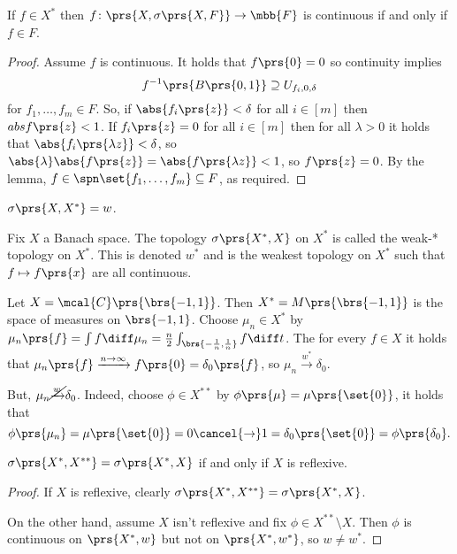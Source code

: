 \documentclass[10pt, twoside]{book}
\begin{document}
\begin{proposition}
If $f \in X^*$ then $f \colon \prs{X, \sigma\prs{X,F}} \to \mbb{F}$ is continuous if and only if $f \in F$.
\end{proposition}

\begin{proof}
Assume $f$ is continuous. It holds that $f\prs{0} = 0$ so continuity implies
\[f^{-1}\prs{B\prs{0,1}} \supseteq U_{f_i, 0, \delta}\]
for $f_1, \ldots, f_m \in F$. So, if $\abs{f_i\prs{z}} < \delta$ for all $i \in [m]$ then $abs{f\prs{z}} < 1$.
If $f_i\prs{z} = 0$ for all $i \in [m]$ then for all $\lambda > 0$ it holds that $\abs{f_i\prs{\lambda z}} < \delta$, so $\abs{\lambda} \abs{f\prs{z}} = \abs{f\prs{\lambda z}} < 1$, so $f\prs{z} = 0$. By the lemma, $f \in \spn\set{f_1, \ldots, f_m} \subseteq F$, as required.
\end{proof}

\begin{example}
$\sigma\prs{X, X^*} = w$.
\end{example}

\begin{example}
Fix $X$ a Banach space. The topology $\sigma\prs{X^*, X}$ on $X^*$ is called the weak-* topology on $X^*$. This is denoted $w^*$ and is the weakest topology on $X^*$ such that $f \mapsto f\prs{x}$ are all continuous.
\end{example}

\begin{example}
Let $X = \mcal{C}\prs{\brs{-1,1}}$. Then $X^* = M\prs{\brs{-1,1}}$ is the space of measures on $\brs{-1,1}$.
Choose $\mu_n \in X^*$ by $\mu_n\prs{f} = \int f \diff \mu_n = \frac{n}{2} \int_{\brs{-\frac{1}{n}, \frac{1}{n}}} f \diff t$.
The for every $f \in X$ it holds that $\mu_n\prs{f} \xrightarrow{n\to\infty} f\prs{0} = \delta_0\prs{f}$, so $\mu_n \xrightarrow{w^*} \delta_0$.

But, $\mu_n \cancel{\xrightarrow{w}} \delta_0$. Indeed, choose $\phi \in X^{**}$ by $\phi\prs{\mu} = \mu\prs{\set{0}}$,
it holds that
\[\phi\prs{\mu_n} = \mu\prs{\set{0}} = 0 \cancel{\rightarrow} 1 = \delta_0\prs{\set{0}} = \phi\prs{\delta_0} \text{.}\]
\end{example}

\begin{proposition}
$\sigma\prs{X^*, X^{**}} = \sigma\prs{X^*, X}$ if and only if $X$ is reflexive.
\end{proposition}

\begin{proof}
If $X$ is reflexive, clearly $\sigma\prs{X^*, X^{**}} = \sigma\prs{X^*, X}$.

On the other hand, assume $X$ isn't reflexive and fix $\phi \in X^{**} \setminus X$. Then $\phi$ is continuous on $\prs{X^*, w}$ but not on $\prs{X^*, w^*}$, so $w \neq w^*$.
\end{proof}
\end{document}

